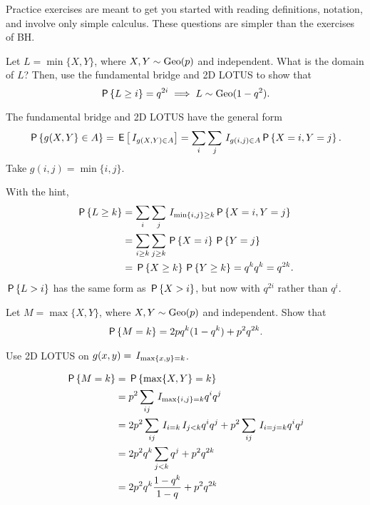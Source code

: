 Practice exercises are meant to get you started with reading definitions, notation, and involve only simple calculus.
These questions are simpler than the exercises of BH.

\begin{exercise}
Let $L=\min\{X, Y\}$, where $X, Y\sim \Geo{p}$ and independent.
What is the domain of $L$? Then, use the fundamental bridge and 2D LOTUS to show that
\begin{equation*}
\P{L\geq i}=q^{2i} \implies L\sim\Geo{1-q^{2}}.
\end{equation*}
\begin{hint}
The fundamental bridge and 2D LOTUS have  the general form
\begin{equation*}
\P{g(X,Y}\in A\} = \E{\1{g(X, Y) \in A}} = \sum_{i}\sum_j \1{g(i, j)\in A} \P{X=i, Y=j}.
  \end{equation*}
Take  $g(i,j) = \min\{i, j\}$.
\end{hint}
\begin{solution}
With the hint,
  \begin{align*}
\P{L\geq k}
&= \sum_{i}\sum_{j} \1{\min\{i,j\}\geq k} \P{X=i, Y=j}\\
&= \sum_{i\geq k} \sum_{j\geq k} \P{X=i}\P{Y=j}\\
&=  \P{X\geq k}\P{Y\geq k} = q^{k} q^{k} = q^{2k}.
  \end{align*}
$\P{L>i}$ has the same form as $\P{X>i}$, but now with $q^{2i}$ rather than $q^{i}$.
\end{solution}
\end{exercise}

\begin{exercise}\label{ex:1}
Let $M=\max\{X, Y\}$, where $X, Y\sim \Geo{p}$ and independent.
Show that
\begin{align*}
\P{M=k} = 2 pq^{k}(1-q^{k}) + p^2q^{2k}.
\end{align*}
\begin{hint}
  Use 2D LOTUS on $g(x,y) = \1{\max\{x, y\} = k}$.
\end{hint}
\begin{solution}
  \begin{align*}
\P{M=k}
&= \P{\max\{X, Y\} = k} \\
&=p^{2}\sum_{ij}\1{\max\{i,j\} =k} q^i q^j\\
&=2 p^{2}\sum_{ij}\1{i=k}\1{j < k} q^i q^j + p^{2}\sum_{ij}\1{i=j=k} q^{i} q^j \\
&=2 p^{2}q^{k}\sum_{j < k} q^j + p^{2}q^{2k}\\
&=2 p^{2}q^{k}\frac{1-q^{k}}{1-q} +  p^{2}q^{2k}\\
  \end{align*}
\end{solution}
\end{exercise}

